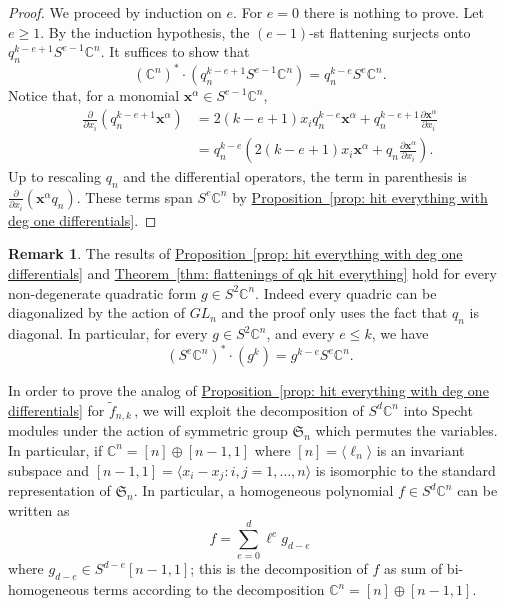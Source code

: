 \documentclass[11pt]{article}
\numberwithin{equation}{section}
\theoremstyle{definition}
\newtheorem{remark}[theorem]{Remark}
\theoremstyle{plain}
\newcommand{\expref}[2]{\hyperref[#2]{#1~\ref{#2}}}
\newcommand{\vvirg}{ , \dots , }
\newcommand{\bfx}{\mathbf{x}}
\newcommand{\bbC}{\mathbb{C}}
\newcommand{\frakS}{\mathfrak{S}}
\renewcommand{\tilde}[1]{\widetilde{#1}}
\def\BC{\mathbb C}
\begin{document}
\begin{proof} 
 We proceed by induction on $e$. For $e = 0$ there is nothing to prove. Let $e\geq 1$. By the induction hypothesis, the $(e -1)$-st flattening surjects onto $ q_n^{k-e+1} S^{e-1} \BC^{n}$. It suffices to show that 
 \[
  (\BC^{n})^* \cdot (q_n^{k-e+1} S^{e-1} \BC^{n}) = q_n^{k-e} S^e \BC^n.
 \]
Notice that, for a monomial $\bfx^\alpha \in S^{e-1} \BC^{n}$, 
\begin{align*}
\frac{\partial}{\partial x_i} (q_n^{k-e+1} \bfx^\alpha ) &= 2(k-e+1) x_i q_n^{k-e} \bfx^\alpha  + q_n^{k-e+1} \frac{\partial \bfx^\alpha }{\partial x_i}  \\ 
&= q_n^{k-e} \left(2(k-e+1) x_i  \bfx^\alpha  + q_n \frac{\partial \bfx^\alpha}{\partial x_i}\right).
\end{align*}
Up to rescaling $q_n$ and the differential operators, the term in parenthesis is $\frac{\partial}{\partial x_i} (\bfx^\alpha q_n)$. These terms span $S^{e}\BC^{n}$ by \expref{Proposition}{prop: hit everything with deg one differentials}.
\end{proof}

\begin{remark}\label{rmk: Lemma holds for every quadric}
The results of \expref{Proposition}{prop: hit everything with deg one differentials} and \expref{Theorem}{thm: flattenings of qk hit everything}
hold for every  non-degenerate quadratic form $g \in S^2 \bbC^n$. Indeed every quadric can be diagonalized by the action of $GL_n$ and the proof only uses the fact that $q_n$ is diagonal. In particular, for every $g \in S^2 \bbC^n$, and every $e \leq k$, we have
\[
( S^e \bbC^n)^* \cdot (g^k ) = g^{k-e} S^{e} \bbC^n.
\]
\end{remark}

In order to prove the analog of \expref{Proposition}{prop: hit everything with deg one differentials} for $\tilde{f}_{n,k}$\,, we will exploit the decomposition of $S^d \bbC^n$ into Specht modules under the action of symmetric group $\frakS_n$ which permutes the variables. In particular, if $\bbC^n = [n] \oplus [n-1,1]$ where $[n] = \langle \ell_n \rangle$ is an invariant subspace and $[n-1,1] = \langle x_i - x_j : i,j = 1 \vvirg n\rangle$ is isomorphic to the standard representation of $\frakS_n$.   In particular, a homogeneous polynomial $f \in S^d \bbC^n$ can be written as 
\begin{equation}\label{eqn: bigraded decomp}
 f = \sum_{e = 0}^d \ell ^e g_{d-e}
\end{equation}
where $g _{d-e} \in S^{d-e} [n-1,1]$; this is the decomposition of $f$ as sum of bi-homogeneous terms according to the decomposition $\bbC^n = [n ] \oplus [n-1,1]$.
\end{document}
